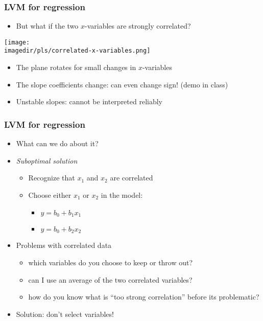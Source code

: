 \begin{frame}\frametitle{LVM for regression}
	\begin{itemize}
		\item	But what if the two $x$-variables are strongly correlated?
	\end{itemize}

	\texttt{[image: \\imagedir/pls/correlated-x-variables.png]}
	\begin{itemize}
		\item	The plane rotates for small changes in $x$-variables
		\item	The slope coefficients change: can even change sign! (demo in class)
		\item	Unstable slopes: cannot be interpreted reliably
	\end{itemize}
\end{frame}

\begin{frame}\frametitle{LVM for regression}
	\begin{itemize}
		\item	What can we do about it?
		\item	\emph{Suboptimal solution}
		\begin{itemize}
			\item	Recognize that $x_1$ and $x_2$ are correlated
			\item	Choose either $x_1$ or $x_2$ in the model:
			\begin{itemize}
				\item	$y = b_0 + b_1 x_1$
				\item	$y = b_0 + b_2 x_2$
			\end{itemize}
		\end{itemize}
	\end{itemize}
	\begin{itemize}
		\item	Problems with correlated data
		\begin{itemize}
			\item	which variables do you choose to keep or throw out?
			\item	can I use an average of the two correlated variables?
			\item	how do you know what is ``too strong correlation'' before its problematic?
		\end{itemize}
	\end{itemize}
	\begin{itemize}
		\item	Solution: don't select variables!
	\end{itemize}
\end{frame}

